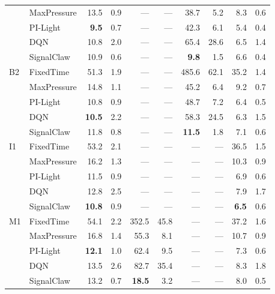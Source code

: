 \begin{table}[t]
\begin{tabular}{ll|rr|rr|rr|rr}
     & MaxPressure & 13.5 & 0.9 & --- & --- & 38.7 & 5.2 & 8.3 & 0.6 \\
     & PI-Light & \textbf{9.5} & 0.7 & --- & --- & 42.3 & 6.1 & 5.4 & 0.4 \\
     & DQN & 10.8 & 2.0 & --- & --- & 65.4 & 28.6 & 6.5 & 1.4 \\
     & SignalClaw & 10.9 & 0.6 & --- & --- & \textbf{9.8} & 1.5 & 6.6 & 0.4 \\
\midrule
    B2 & FixedTime & 51.3 & 1.9 & --- & --- & 485.6 & 62.1 & 35.2 & 1.4 \\
     & MaxPressure & 14.8 & 1.1 & --- & --- & 45.2 & 6.4 & 9.2 & 0.7 \\
     & PI-Light & 10.8 & 0.9 & --- & --- & 48.7 & 7.2 & 6.4 & 0.5 \\
     & DQN & \textbf{10.5} & 2.2 & --- & --- & 58.3 & 24.5 & 6.3 & 1.5 \\
     & SignalClaw & 11.8 & 0.8 & --- & --- & \textbf{11.5} & 1.8 & 7.1 & 0.6 \\
\midrule
    I1 & FixedTime & 53.2 & 2.1 & --- & --- & --- & --- & 36.5 & 1.5 \\
     & MaxPressure & 16.2 & 1.3 & --- & --- & --- & --- & 10.3 & 0.9 \\
     & PI-Light & 11.5 & 0.9 & --- & --- & --- & --- & 6.9 & 0.6 \\
     & DQN & 12.8 & 2.5 & --- & --- & --- & --- & 7.9 & 1.7 \\
     & SignalClaw & \textbf{10.8} & 0.9 & --- & --- & --- & --- & \textbf{6.5} & 0.6 \\
\midrule
    M1 & FixedTime & 54.1 & 2.2 & 352.5 & 45.8 & --- & --- & 37.2 & 1.6 \\
     & MaxPressure & 16.8 & 1.4 & 55.3 & 8.1 & --- & --- & 10.7 & 0.9 \\
     & PI-Light & \textbf{12.1} & 1.0 & 62.4 & 9.5 & --- & --- & 7.3 & 0.6 \\
     & DQN & 13.5 & 2.6 & 82.7 & 35.4 & --- & --- & 8.3 & 1.8 \\
     & SignalClaw & 13.2 & 0.7 & \textbf{18.5} & 3.2 & --- & --- & 8.0 & 0.5 \\
\bottomrule
\end{tabular}
\end{table}
